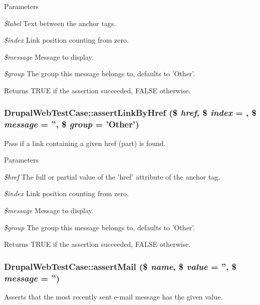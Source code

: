 \begin{DoxyParams}{Parameters}
\item[{\em \$label}]Text between the anchor tags. \item[{\em \$index}]Link position counting from zero. \item[{\em \$message}]Message to display. \item[{\em \$group}]The group this message belongs to, defaults to 'Other'. \end{DoxyParams}
\begin{DoxyReturn}{Returns}
TRUE if the assertion succeeded, FALSE otherwise. 
\end{DoxyReturn}
\hypertarget{classDrupalWebTestCase_ad2af4071eecc15d87251bf2689bedd0c}{
\subsubsection[{assertLinkByHref}]{\setlength{\rightskip}{0pt plus 5cm}DrupalWebTestCase::assertLinkByHref (\$ {\em href}, \/  \$ {\em index} = {}, \/  \$ {\em message} = {\ttfamily ''}, \/  \$ {\em group} = {\ttfamily 'Other'})}}
\label{classDrupalWebTestCase_ad2af4071eecc15d87251bf2689bedd0c}
Pass if a link containing a given href (part) is found.


\begin{DoxyParams}{Parameters}
\item[{\em \$href}]The full or partial value of the 'href' attribute of the anchor tag. \item[{\em \$index}]Link position counting from zero. \item[{\em \$message}]Message to display. \item[{\em \$group}]The group this message belongs to, defaults to 'Other'.\end{DoxyParams}
\begin{DoxyReturn}{Returns}
TRUE if the assertion succeeded, FALSE otherwise. 
\end{DoxyReturn}
\hypertarget{classDrupalWebTestCase_ad318f30726058caea940c1aeed1bd182}{
\subsubsection[{assertMail}]{\setlength{\rightskip}{0pt plus 5cm}DrupalWebTestCase::assertMail (\$ {\em name}, \/  \$ {\em value} = {\ttfamily ''}, \/  \$ {\em message} = {\ttfamily ''})}}
\label{classDrupalWebTestCase_ad318f30726058caea940c1aeed1bd182}
Asserts that the most recently sent e-\/mail message has the given value.

